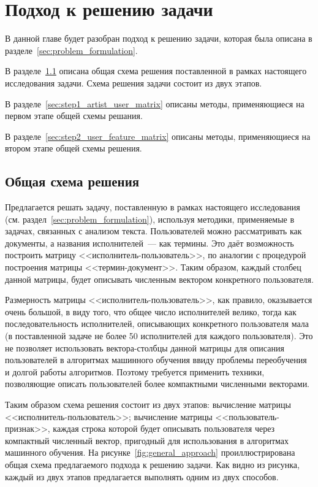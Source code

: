 \chapter{Подход к решению задачи}
\label{ch:problem_solving}

В данной главе будет разобран подход к решению задачи,
которая была описана в разделе~\ref{sec:problem_formulation}.

В разделе~\ref{sec:general_approach} описана общая схема
решения поставленной в рамках настоящего исследования задачи.
Схема решения задачи состоит из двух этапов.

В разделе~\ref{sec:step1_artist_user_matrix} описаны методы,
применяющиеся на первом этапе общей схемы решания.

В разделе~\ref{sec:step2_user_feature_matrix} описаны методы,
применяющиеся на втором этапе общей схемы решения.

\section{Общая схема решения}
\label{sec:general_approach}

Предлагается решать задачу, поставленную в рамках настоящего
исследования (см. раздел~\ref{sec:problem_formulation}),
используя методики, применяемые в задачах, связанных с анализом
текста. Пользователей можно рассматривать как документы, а
названия исполнителей~--- как термины. Это даёт возможность
построить матрицу <<исполнитель-пользователь>>, по аналогии
с процедурой построения матрицы <<термин-документ>>. Таким
образом, каждый столбец данной матрицы, будет описывать
численным вектором конкретного пользователя.

Размерность матрицы <<исполнитель-пользователь>>, как
правило, оказывается очень большой, в виду того, что
общее число исполнителей велико, тогда как последовательность
исполнителей, описывающих конкретного пользователя мала
(в поставленной задаче не более 50 исполнителей для каждого
пользователя). Это не позволяет использовать вектора-столбцы
данной матрицы для описания пользователей в алгоритмах
машинного обучения ввиду проблемы переобучения и долгой
работы алгоритмов. Поэтому требуется применить техники,
позволяющие описать пользователей более компактными
численными векторами.

Таким образом схема решения состоит из двух этапов:
вычисление матрицы <<исполнитель-пользователь>>; вычисление
матрицы <<пользователь-признак>>, каждая строка которой
будет описывать пользователя через компактный численный вектор,
пригодный для использования в алгоритмах машинного обучения.
На рисунке~\ref{fig:general_approach} проиллюстрирована
общая схема предлагаемого подхода к решению задачи. Как видно
из рисунка, каждый из двух этапов предлагается
выполнять одним из двух способов.

